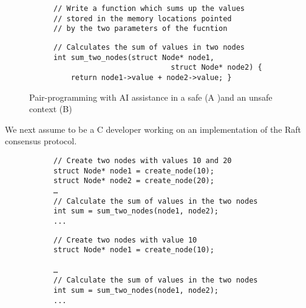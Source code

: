 \begin{itemize}
\begin{figure}[t]
{\begin{subfigure}{0.49\textwidth}
\begin{verbatim}
// Write a function which sums up the values
// stored in the memory locations pointed 
// by the two parameters of the fucntion
\end{verbatim}
\label{fig:exmem-leak}
  \end{subfigure}
}
{\footnotesize
\begin{subfigure}{0.49\textwidth}
\begin{verbatim}
// Calculates the sum of values in two nodes
int sum_two_nodes(struct Node* node1, 
                           struct Node* node2) {
    return node1->value + node2->value; }
\end{verbatim}
\label{fig:exmem-leak}
  \end{subfigure}
}
\caption{Pair-programming with AI assistance in a safe (A )and an unsafe context (B)}
\end{figure}

We next assume to be a C developer working on an implementation of the Raft consensus protocol. 

\begin{figure}[t]
{\footnotesize
\begin{subfigure}{0.49\textwidth}
\begin{verbatim}
// Create two nodes with values 10 and 20
struct Node* node1 = create_node(10);
struct Node* node2 = create_node(20);
…
// Calculate the sum of values in the two nodes
int sum = sum_two_nodes(node1, node2);
...
\end{verbatim}
\label{fig:exnull-manifest}
  \end{subfigure}
}
{\footnotesize
\begin{subfigure}{0.49\textwidth}
\begin{verbatim}
// Create two nodes with value 10 
struct Node* node1 = create_node(10);

…
// Calculate the sum of values in the two nodes
int sum = sum_two_nodes(node1, node2);
...
\end{verbatim}
\label{fig:exnull-manifest}
  \end{subfigure}
}
\\~\\~\\
{\footnotesize
\begin{subfigure}{0.49\textwidth}
\begin{verbatim}



\end{verbatim}
\end{subfigure}}
\end{figure}
\end{itemize}
